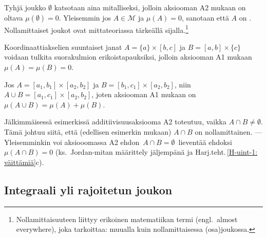 Tyhjä joukko $\emptyset$ katsotaan aina mitalliseksi, jolloin aksiooman A2 mukaan on oltava
$\mu(\emptyset)=0$. Yleisemmin jos $A \in \mathcal{M}$ ja $\mu(A)=0$, sanotaan että $A$ on
%
. Nollamittaiset joukot ovat mittateoriassa tärkeällä
sijalla.\footnote[2]{Nollamittaisuuteen liittyy erikoinen matematiikan termi
 (engl.\ almost everywhere), joka tarkoittaa: muualla kuin
nollamittaisessa (osa)joukossa. }
\begin{Exa} Koordinaattiakselien suuntaiset janat $A=\{a\}\times[b,c]$ ja
$B=[a,b]\times\{c\}$ voidaan tulkita suorakulmion erikoistapauksiksi, jolloin aksiooman A1
mukaan $\mu(A)=\mu(B)=0$. \loppu
\end{Exa}
\begin{Exa} Jos $A=[a_1,b_1]\times[a_2,b_2]$ ja $B=[b_1,c_1]\times[a_2,b_2]$, niin
$A \cup B=[a_1,c_1]\times[a_2,b_2]$, joten aksiooman A1 mukaan on
$\mu(A \cup B)=\mu(A)+\mu(B)$. \loppu
\end{Exa}
Jälkimmäisessä esimerkissä additiivisuusaksiooma A2 toteutuu, vaikka $A \cap B\neq\emptyset$.
Tämä johtuu siitä, että (edellisen esimerkin mukaan) $A \cap B$ on nollamittainen.
--- Yleisemminkin voi aksiooomassa A2 ehdon $\,A \cap B = \emptyset\,$ lieventää ehdoksi
$\mu(A \cap B)=0$ (ks.\ Jordan-mitan määrittely jäljempänä ja
Harj.teht.\,\ref{H-uint-1: väittämiä}c).

\subsection*{Integraali yli rajoitetun joukon}

